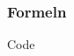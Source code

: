 \begin{frame}
    \frametitle{Formeln}
    \begin{block}{Code}
        \begin{columns}
            \begin{column}{0.60\textwidth}
                
            \end{column}
            \begin{column}{0.3\textwidth}
                \centering
                
            \end{column}
        \end{columns}
        \pause
        \begin{columns}
            \begin{column}{0.60\textwidth}
                
            \end{column}
            \begin{column}{0.3\textwidth}
                \centering
                
            \end{column}
        \end{columns}
    \end{block}
\end{frame}
